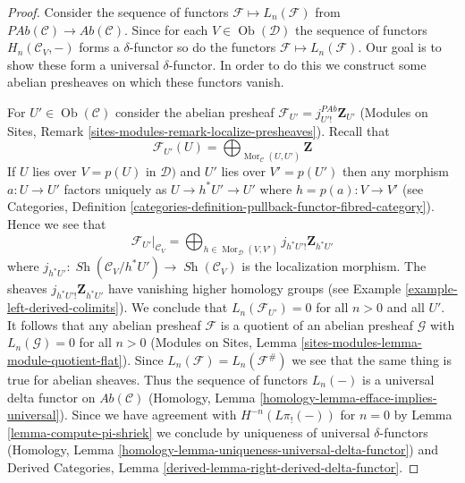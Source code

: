 \documentclass[10pt,a4paper]{amsart}
\theoremstyle{plain}
\theoremstyle{definition}
\theoremstyle{remark}
\numberwithin{equation}{subsection}
\def\Mor{\mathop{\mathrm{Mor}}\nolimits}
\def\Ob{\mathop{\mathrm{Ob}}\nolimits}
\def\Sh{\mathop{\mathit{Sh}}\nolimits}
\begin{document}
\begin{proof}
Consider the sequence of functors $\mathcal{F} \mapsto L_n(\mathcal{F})$
from $\textit{PAb}(\mathcal{C}) \to \textit{Ab}(\mathcal{C})$.
Since for each $V \in \Ob(\mathcal{D})$ the sequence of functors
$H_n(\mathcal{C}_V, - )$ forms a $\delta$-functor
so do the functors $\mathcal{F} \mapsto L_n(\mathcal{F})$.
Our goal is to show these form a universal $\delta$-functor.
In order to do this we construct some abelian presheaves
on which these functors vanish.

\medskip\noindent
For $U' \in \Ob(\mathcal{C})$ consider the abelian presheaf
$\mathcal{F}_{U'} = j_{U'!}^{\textit{PAb}}\mathbf{Z}_{U'}$
(Modules on Sites, Remark \ref{sites-modules-remark-localize-presheaves}).
Recall that
$$
\mathcal{F}_{U'}(U) =
\bigoplus\nolimits_{\Mor_\mathcal{C}(U, U')} \mathbf{Z}
$$
If $U$ lies over $V = p(U)$ in $\mathcal{D})$ and $U'$ lies over $V' = p(U')$
then any morphism $a : U \to U'$ factors uniquely as $U \to h^*U' \to U'$
where $h = p(a) : V \to V'$ (see
Categories, Definition
\ref{categories-definition-pullback-functor-fibred-category}).
Hence we see that
$$
\mathcal{F}_{U'}|_{\mathcal{C}_V}
=
\bigoplus\nolimits_{h \in \Mor_\mathcal{D}(V, V')}
j_{h^*U'!}\mathbf{Z}_{h^*U'}
$$
where $j_{h^*U'} : \Sh(\mathcal{C}_V/h^*U') \to \Sh(\mathcal{C}_V)$
is the localization morphism. The sheaves $j_{h^*U'!}\mathbf{Z}_{h^*U'}$
have vanishing higher homology groups (see
Example \ref{example-left-derived-colimits}).
We conclude that $L_n(\mathcal{F}_{U'}) = 0$ for all $n > 0$ and all $U'$.
It follows that any abelian presheaf $\mathcal{F}$ is a quotient
of an abelian presheaf $\mathcal{G}$ with $L_n(\mathcal{G}) = 0$ for
all $n > 0$ (Modules on Sites, Lemma
\ref{sites-modules-lemma-module-quotient-flat}).
Since $L_n(\mathcal{F}) = L_n(\mathcal{F}^\#)$ we see
that the same thing is true for abelian sheaves. Thus
the sequence of functors $L_n(-)$ is a universal delta functor
on $\textit{Ab}(\mathcal{C})$
(Homology, Lemma \ref{homology-lemma-efface-implies-universal}).
Since we have agreement with
$H^{-n}(L\pi_!(-))$ for $n = 0$ by
Lemma \ref{lemma-compute-pi-shriek}
we conclude by uniqueness of universal $\delta$-functors
(Homology, Lemma \ref{homology-lemma-uniqueness-universal-delta-functor})
and
Derived Categories, Lemma \ref{derived-lemma-right-derived-delta-functor}.
\end{proof}
\end{document}
